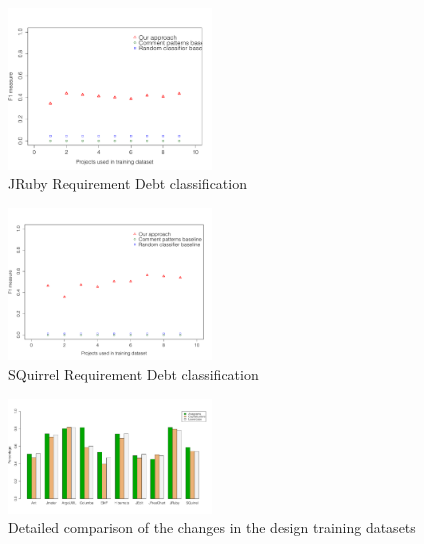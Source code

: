 \begin{figure}[thb!]
  \centering
  \includegraphics[width=0.48\textwidth]{figures/appendix/iteration_details/implementation_jruby.pdf}
  \vspace{-3mm}
  \caption{JRuby Requirement Debt classification}
  \label{fig:implementation_jruby}
\end{figure}

\begin{figure}[thb!]
  \centering
  \includegraphics[width=0.48\textwidth]{figures/appendix/iteration_details/implementation_sql12.pdf}
  \vspace{-3mm}
  \caption{SQuirrel Requirement Debt classification}
  \label{fig:implementation_sql}
\end{figure}

\clearpage

\begin{figure}[thb!]
  \centering
  \includegraphics[width=0.48\textwidth]{figures/appendix/detailed_comparison_design_training_dataset.pdf}
  \vspace{-3mm}
  \caption{Detailed comparison of the changes in the design training datasets}
  \label{fig:detailed_comparison_design_training_dataset}
\end{figure}

